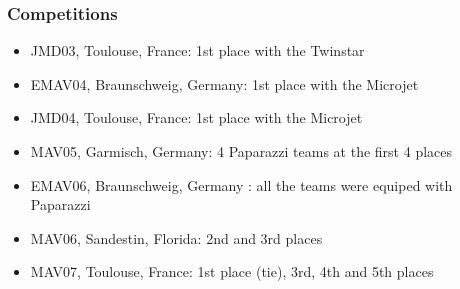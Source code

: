 \begin{frame}
\frametitle{Competitions}
\begin{itemize}
  \item JMD03, Toulouse, France: 1st place with the Twinstar
  \item EMAV04, Braunschweig, Germany: 1st place with the Microjet
  \item JMD04, Toulouse, France: 1st place with the Microjet
  \item MAV05, Garmisch, Germany: 4 Paparazzi teams at the first 4 places
  \item EMAV06, Braunschweig, Germany : all the teams were equiped with
  Paparazzi
  \item MAV06, Sandestin, Florida: 2nd and 3rd places
  \item MAV07, Toulouse, France: 1st place (tie), 3rd, 4th and 5th places
\end{itemize}
\end{frame}

